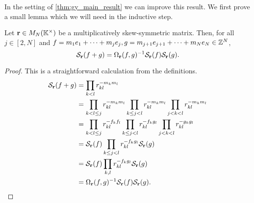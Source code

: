 In the setting of \cref{thm:gy_main_result} we can improve this result. We first prove
a small lemma which we will need in the inductive step.
\begin{lemma}\label{lem:symmetrization_of_sum}

	Let $\mathbf{r} \in M_N(\mathbb{K}^\times)$ be a multiplicatively skew-symmetric matrix. Then, for
	all $j \in [2, N]$ and $f = m_1 e_1 + \dots + m_j e_j, g = m_{j+1} e_{j+1} + \dots +
		m_{N} e_N \in \mathbb{Z}^N$,
	\begin{equation*}
		\mathcal{S}_{\mathbf{r}}(f+g) = \Omega_{\mathbf{r}}(f,g)^{-1} \mathcal{S}_{\mathbf{r}}(f)\mathcal{S}_{\mathbf{r}}(g).
	\end{equation*}
\end{lemma}
\begin{proof}
	This is a straightforward calculation from the definitions.
	\begin{align*}
		\mathcal{S}_{\mathbf{r}}(f+g)
		 & = \prod_{k < l}r_{kl}^{-m_k m_l}                                                                                 \\
		 & = \prod_{k < l \leq j}r_{kl}^{-m_k m_l} \prod_{k \leq j < l}r_{kl}^{-m_k m_l} \prod_{j < k < l}r_{kl}^{-m_k m_l} \\
		 & = \prod_{k < l \leq j}r_{kl}^{-f_k f_l} \prod_{k \leq j < l}r_{kl}^{-f_k g_l} \prod_{j < k < l}r_{kl}^{-g_k g_l} \\
		 & = \mathcal{S}_{\mathbf{r}}(f) \prod_{k \leq j < l}r_{kl}^{-f_k g_l} \mathcal{S}_{\mathbf{r}}(g)                                            \\
		 & = \mathcal{S}_{\mathbf{r}}(f) \prod_{k, l}r_{kl}^{-f_k g_l} \mathcal{S}_{\mathbf{r}}(g)                                                    \\
		 & = \Omega_{\mathbf{r}}(f,g)^{-1} \mathcal{S}_{\mathbf{r}}(f) \mathcal{S}_{\mathbf{r}}(g).
	\end{align*}
\end{proof}
